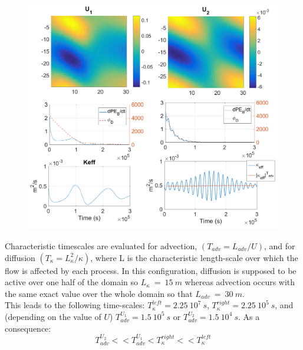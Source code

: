 \begin{figure}[h!]
\centering
\includegraphics[width=1\textwidth]{./CHAP_BPE/Fig_numlab_advdiff3.png}
\caption{ }
\label{fig4numlab}
\end{figure}
Characteristic timescales are evaluated for advection, $(T_{adv}=L_{adv}/U)$, and for diffusion $(T_{\kappa}=L_{\kappa}^2/{\kappa})$, where L is the characteristic length-scale over which the flow is affected by each process. In this configuration, diffusion is supposed to be active over one half of the domain so $L_{\kappa}\ =\ 15\ m$ whereas advection occurs with the same exact value over the whole domain so that $L_{adv}\ =\ 30\ m$.\\
This leads to the following time-scales: $T_{\kappa}^{left}=2.25 \ 10^7 \ s$, $T_{\kappa}^{right}=2.25 \ 10^5 \ s$, and (depending on the value of $U$) $T_{adv}^{U_1}=1.5 \ 10^5 \ s$ or $T_{adv}^{U_2}=1.5 \ 10^4 \ s$. As a consequence:
\begin{equation}
\displaystyle
T_{adv}^{U_2}<<T_{adv}^{U_1}<T_{\kappa}^{right}<<T_{\kappa}^{left}
\end{equation}
